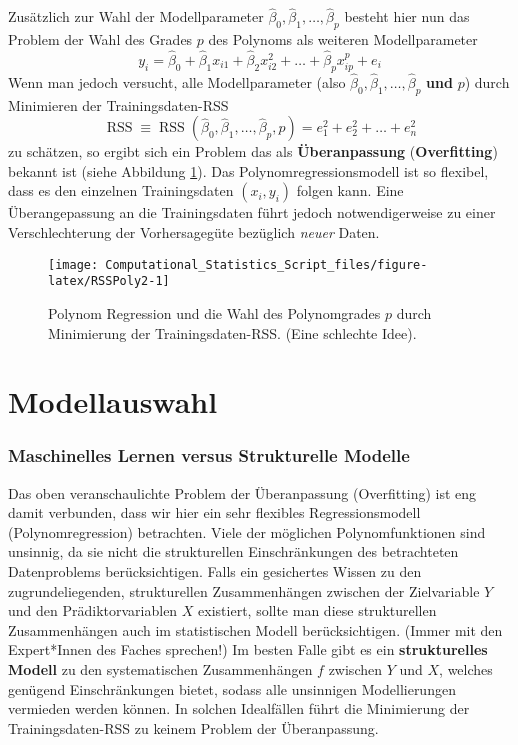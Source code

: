 \documentclass[
  ngerman,
]{book}
\begin{document}
Zusätzlich zur Wahl der Modellparameter \(\hat{\beta}_0, \hat{\beta}_1, \dots, \hat{\beta}_p\) besteht hier nun das Problem
der Wahl des Grades \(p\) des Polynoms als weiteren Modellparameter
\[
y_i=\hat{\beta}_0 + \hat{\beta}_1 x_{i1} + \hat{\beta}_2 x_{i2}^2 + \dots + \hat{\beta}_p x_{ip}^p + e_i
\]
Wenn man jedoch versucht, alle Modellparameter (also \(\hat{\beta}_0, \hat{\beta}_1, \dots, \hat{\beta}_p\) \textbf{und} \(p\)) durch Minimieren der Trainingsdaten-RSS
\[
\operatorname{RSS}\equiv\operatorname{RSS}(\hat{\beta}_0, \hat{\beta}_1, \dots, \hat{\beta}_p,p)=e_1^2 + e_2^2 + \dots + e_n^2
\]
zu schätzen, so ergibt sich ein Problem das als \textbf{Überanpassung} (\textbf{Overfitting}) bekannt ist (siehe Abbildung \ref{fig:RSSPoly2}). Das Polynomregressionsmodell ist so flexibel, dass es den einzelnen Trainingsdaten \((x_i,y_i)\) folgen kann. Eine Überangepassung an die Trainingsdaten führt jedoch notwendigerweise zu einer Verschlechterung der Vorhersagegüte bezüglich \emph{neuer} Daten.

\begin{figure}[h]

{\centering \texttt{[image: Computational\_Statistics\_Script\_files/figure-latex/RSSPoly2-1]} 

}

\caption{Polynom Regression und die Wahl des Polynomgrades $p$ durch Minimierung der Trainingsdaten-RSS. (Eine schlechte Idee).}\label{fig:RSSPoly2}
\end{figure}

\hypertarget{modellauswahl}{%
\section{Modellauswahl}\label{modellauswahl}}

\hypertarget{maschinelles-lernen-versus-strukturelle-modelle}{%
\subsubsection*{Maschinelles Lernen versus Strukturelle Modelle}\label{maschinelles-lernen-versus-strukturelle-modelle}}

Das oben veranschaulichte Problem der Überanpassung (Overfitting) ist eng damit verbunden, dass wir hier ein sehr flexibles Regressionsmodell (Polynomregression) betrachten. Viele der möglichen Polynomfunktionen sind unsinnig, da sie nicht die strukturellen Einschränkungen des betrachteten Datenproblems berücksichtigen. Falls ein gesichertes Wissen zu den zugrundeliegenden, strukturellen Zusammenhängen zwischen der Zielvariable \(Y\) und den Prädiktorvariablen \(X\) existiert, sollte man diese strukturellen Zusammenhängen auch im statistischen Modell berücksichtigen. (Immer mit den Expert*Innen des Faches sprechen!) Im besten Falle gibt es ein \textbf{strukturelles Modell} zu den systematischen Zusammenhängen \(f\) zwischen \(Y\) und \(X\), welches genügend Einschränkungen bietet, sodass alle unsinnigen Modellierungen vermieden werden können. In solchen Idealfällen führt die Minimierung der Trainingsdaten-RSS zu keinem Problem der Überanpassung.
\end{document}

